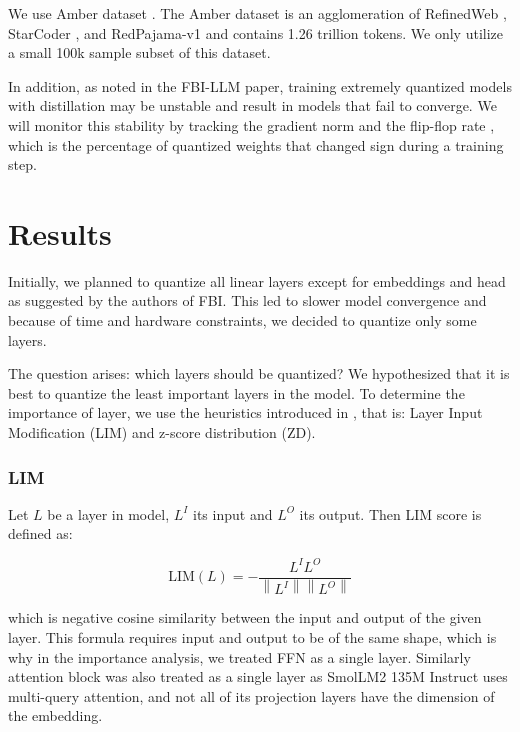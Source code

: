 \documentclass{article}
\begin{document}
We use Amber dataset \cite{llm360}. The Amber dataset is an agglomeration of RefinedWeb \cite{refinedweb}, StarCoder \cite{starcoder}, and RedPajama-v1 \cite{redpajama} and contains 1.26 trillion tokens. We only utilize a small 100k sample subset of this dataset.

In addition, as noted in the FBI-LLM paper, training extremely quantized models with distillation may be unstable and result in models that fail to converge. We will monitor this stability by tracking the gradient norm and the flip-flop rate \cite{flipflop}, which is the percentage of quantized weights that changed sign during a training step.

\section{Results}

Initially, we planned to quantize all linear layers except for embeddings and head as suggested by the authors of FBI. This led to slower model convergence and because of time and hardware constraints, we decided to quantize only some layers.

The question arises: which layers should be quantized? We hypothesized that it is best to quantize the least important layers in the model. To determine the importance of layer, we use the heuristics introduced in \cite{dumitru2024layerwisequantizationpragmaticeffective}, that is: Layer Input Modification (LIM) and z-score distribution (ZD).

\subsubsection{LIM}

Let \(L\) be a layer in model, \(L^I\) its input and \(L^O\) its output. Then LIM score is defined as:

\begin{equation*}
    \mathrm{LIM}(L) = -\frac{L^IL^O}{\left\lVert L^I \right\rVert\left\lVert L^O \right\rVert}
\end{equation*}

which is negative cosine similarity between the input and output of the given layer. This formula requires input and output to be of the same shape, which is why in the importance analysis, we treated FFN as a single layer. Similarly attention block was also treated as a single layer as SmolLM2 135M Instruct uses multi-query attention, and not all of its projection layers have the dimension of the embedding.
\end{document}
